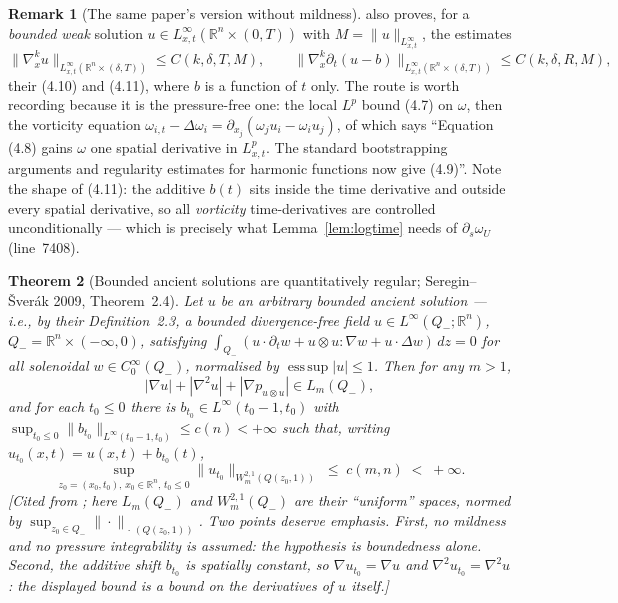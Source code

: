 \documentclass[11pt]{article}
\newtheorem{theorem}{Theorem}[section]
\theoremstyle{definition}
\newtheorem{remark}[theorem]{Remark}
\theoremstyle{remark}
\newcommand{\R}{\mathbb{R}}
\begin{document}
\begin{remark}[The same paper's version without mildness]
  \label{rem:s48-knss410}
  \cite{KNSS2009} also proves, for a \emph{bounded weak} solution
  $u\in L^\infty_{x,t}(\R^n\times(0,T))$ with
  $M=\|u\|_{L^\infty_{x,t}}$, the estimates
  \[
    \|\nabla_x^ku\|_{L^\infty_{x,t}(\R^n\times(\delta,T))}\leq C(k,\delta,T,M),
    \qquad
    \|\nabla_x^k\partial_t(u-b)\|_{L^\infty_{x,t}(\R^n\times(\delta,T))}
      \leq C(k,\delta,R,M),
  \]
  their (4.10) and (4.11), where $b$ is a function of $t$ only. The route is
  worth recording because it is the pressure-free one: the local $L^p$ bound
  (4.7) on $\omega$, then the vorticity equation
  $\omega_{i,t}-\Delta\omega_i=\partial_{x_j}(\omega_ju_i-\omega_iu_j)$, of
  which \cite{KNSS2009} says ``Equation (4.8) gains $\omega$ one spatial
  derivative in $L^p_{x,t}$. The standard bootstrapping arguments and
  regularity estimates for harmonic functions now give (4.9)''. Note the
  shape of (4.11): the additive $b(t)$ sits inside the time derivative and
  outside every spatial derivative, so all \emph{vorticity} time-derivatives
  are controlled unconditionally --- which is precisely what
  Lemma~\ref{lem:logtime} needs of $\partial_s\omega_U$ (line~7408).
\end{remark}

\begin{theorem}[Bounded ancient solutions are quantitatively regular;
  Seregin--\v{S}ver\'ak 2009, Theorem~2.4]\label{thm:s48-SS24}
  Let $u$ be an arbitrary bounded ancient solution --- i.e., by their
  Definition~2.3, a bounded divergence-free field
  $u\in L^\infty(Q_-;\R^n)$, $Q_-=\R^n\times(-\infty,0)$, satisfying
  $\int_{Q_-}(u\cdot\partial_tw+u\otimes u:\nabla w+u\cdot\Delta w)\,dz=0$ for
  all solenoidal $w\in C_0^\infty(Q_-)$, normalised by
  $\operatorname*{ess\,sup}|u|\leq1$. Then for any $m>1$,
  \[
    |\nabla u|+|\nabla^2u|+|\nabla p_{u\otimes u}| \in L_m(Q_-) ,
  \]
  and for each $t_0\leq0$ there is $b_{t_0}\in L^\infty(t_0-1,t_0)$ with
  $\sup_{t_0\leq0}\|b_{t_0}\|_{L^\infty(t_0-1,t_0)}\leq c(n)<+\infty$ such
  that, writing $u_{t_0}(x,t)=u(x,t)+b_{t_0}(t)$,
  \[
    \sup_{z_0=(x_0,t_0),\,x_0\in\R^n,\,t_0\leq0}
      \|u_{t_0}\|_{W^{2,1}_m(Q(z_0,1))} \;\leq\; c(m,n)\;<\;+\infty .
  \]
  \emph{[Cited from \cite[Thm.~2.4, Def.~2.3, (4.8)]{SereginSverak2009}; here
  $L_m(Q_-)$ and $W^{2,1}_m(Q_-)$ are their ``uniform'' spaces, normed by
  $\sup_{z_0\in Q_-}\|\cdot\|_{\,\cdot\,(Q(z_0,1))}$. Two points deserve
  emphasis. First, \emph{no mildness and no pressure integrability is
  assumed}: the hypothesis is boundedness alone. Second, the additive shift
  $b_{t_0}$ is spatially constant, so $\nabla u_{t_0}=\nabla u$ and
  $\nabla^2u_{t_0}=\nabla^2u$: the displayed bound is a bound on the
  derivatives of $u$ itself.]}
\end{theorem}
\end{document}
